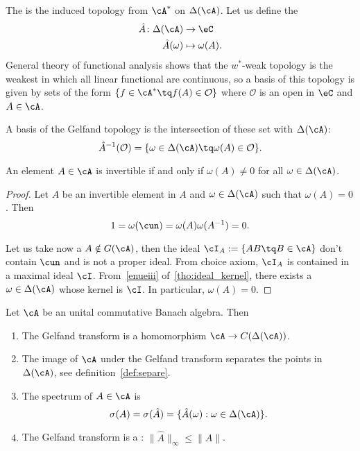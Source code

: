 The  is the induced topology from $\cA^*$ on $\Delta(\cA)$. Let us define the 
        \begin{equation}
        \begin{aligned}
            \hat A \colon \Delta(\cA) &\to \eC\\
            \hat A(\omega)&\mapsto \omega(A).
        \end{aligned}
    \end{equation}
General theory of functional analysis shows that the $w^*$-weak topology is the weakest in which all linear functional are continuous, so a basis of this topology is given by sets of the form $\{f\in\cA^*\tq f(A)\in\mathcal{O}\}$ where $\mathcal{O}$ is an open in $\eC$ and $A\in\cA$.

A basis of the Gelfand topology is the intersection of these set with $\Delta(\cA)$:
\begin{equation}
  \hat A^{-1}(\mathcal{O})=\{\omega\in\Delta(\cA)\tq \omega(A)\in\mathcal{O}\}.
\end{equation}



\begin{lemma}
An element $A\in\cA$ is invertible if and only if $\omega(A)\neq0$ for all $\omega\in\Delta(\cA)$.
\end{lemma}


\begin{proof}
Let $A$ be an invertible element in $A$ and $\omega\in\Delta(\cA)$ such that $\omega(A)=0$. Then
\[
  1=\omega(\cun)=\omega(A)\omega(A^{-1})=0.
\]

Let us take now a $A\notin G(\cA)$, then the ideal $\cI_A:=\{AB\tq B\in\cA\}$ don't contain $\cun$ and is not a proper ideal. From choice axiom, $\cI_A$ is contained in a maximal ideal $\cI$. From~\ref{enueiii} of~\ref{tho:ideal_kernel}, there exists a $\omega\in\Delta(\cA)$ whose kernel is $\cI$. In particular, $\omega(A)=0$.
\end{proof}

\begin{theorem}
Let $\cA$ be an unital commutative Banach algebra. Then
\begin{enumerate}
\item The Gelfand transform is a homomorphism $\cA\to C(\Delta(\cA))$. \label{enugi}
\item The image of $\cA$ under the Gelfand transform separates the points in $\Delta(\cA)$, see definition~\ref{def:separe}. \label{enugii}
\item \label{enugiii} The spectrum of $A\in\cA$ is
\[
   \sigma(A)=\sigma(\hat A)=\{\hat A(\omega):\omega\in\Delta(\cA)\}.
\]
\item \label{enugiv} The Gelfand transform is a :   $\|\hat A\|_{\infty}\leq\|A\|$.
\end{enumerate}\label{tho:unital_comm}
\end{theorem}

